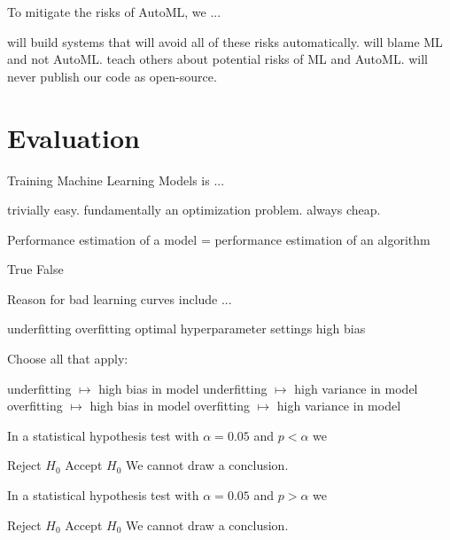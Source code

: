 \documentclass{exam}
\begin{document}
\begin{questions}
\question To mitigate the risks of AutoML, we ...
\begin{choices}
 \choice will build systems that will avoid all of these risks automatically.
 \choice will blame ML and not AutoML.
 \choice teach others about potential risks of ML and AutoML.
 \choice will never publish our code as open-source.
\end{choices}

\section{Evaluation}
\question Training Machine Learning Models is ...
\begin{choices}
    \choice trivially easy.
    \choice fundamentally an optimization problem. %
    \choice always cheap.
\end{choices}

\question Performance estimation of a model = performance estimation of an algorithm
\begin{choices}
    \choice True
    \choice False %
\end{choices}

\question Reason for bad learning curves include ...
\begin{choices}
    \choice underfitting %
    \choice overfitting %
    \choice optimal hyperparameter settings
    \choice high bias   %
\end{choices}

\question Choose all that apply:
\begin{choices}
    \choice underfitting $\mapsto$ high bias in model %
    \choice underfitting $\mapsto$ high variance in model
    \choice overfitting $\mapsto$ high bias in model
    \choice overfitting $\mapsto$ high variance in model %
\end{choices}

\question In a statistical hypothesis test with $\alpha = 0.05$ and $p < \alpha$ we
\begin{choices}
    \choice Reject $H_0$ %
    \choice Accept $H_0$
    \choice We cannot draw a conclusion.
\end{choices}

\question In a statistical hypothesis test with $\alpha = 0.05$ and $p > \alpha$ we
\begin{choices}
    \choice Reject $H_0$
    \choice Accept $H_0$
    \choice We cannot draw a conclusion. %
\end{choices}


\end{questions}
\end{document}
